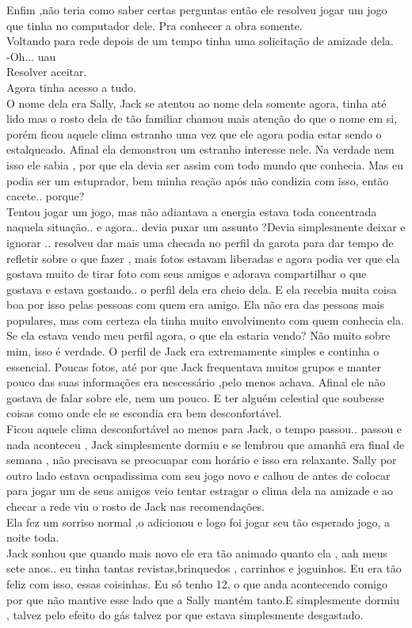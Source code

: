 \documentclass{book}
\begin{document}
 Enfim ,não teria como saber certas perguntas então ele resolveu jogar um jogo que tinha no computador dele. Pra conhecer a obra somente.\\
 Voltando para rede depois de um tempo tinha uma solicitação de amizade dela. \\
 -Oh... uau\\
 Resolver aceitar.\\
 Agora tinha acesso a tudo. \\
O nome dela era Sally, Jack se atentou ao nome dela somente agora, tinha até lido mas o rosto dela de tão familiar chamou mais atenção do que o nome em si, porém ficou aquele clima estranho uma vez que ele agora podia estar sendo o estalqueado. Afinal ela demonstrou um estranho interesse nele. Na verdade nem isso ele sabia , por que ela devia ser assim com todo mundo que conhecia. Mas eu podia ser um estuprador, bem minha reação após não condizia com isso, então cacete.. porque? \\ 
 Tentou jogar um jogo, mas não adiantava a energia estava toda concentrada naquela situação.. e agora.. devia puxar um assunto ?Devia simplesmente deixar e ignorar .. resolveu dar mais uma checada no perfil da garota para dar tempo de refletir sobre o que fazer , mais fotos estavam liberadas e agora podia ver que ela gostava muito de tirar foto com seus amigos e adorava compartilhar o que gostava e estava gostando.. o perfil dela era cheio dela. E ela recebia muita coisa boa por isso pelas pessoas com quem era amigo. Ela não era das pessoas mais populares, mas com certeza ela tinha muito envolvimento com quem conhecia ela. \\
 Se ela estava vendo meu perfil agora, o que ela estaria vendo? Não muito sobre mim, isso é verdade. O perfil de Jack era extremamente simples e continha o essencial. Poucas fotos, até por que Jack frequentava muitos grupos e manter pouco das suas informações era nescessário ,pelo menos achava. Afinal ele não gostava de falar sobre ele, nem um pouco. E ter alguém celestial que soubesse coisas como onde ele se escondia era bem desconfortável. \\
 Ficou aquele clima desconfortável ao menos para Jack, o tempo passou.. passou e nada aconteceu , Jack simplesmente dormiu e se lembrou que amanhã era final de semana , não precisava se preocuapar com horário e isso era relaxante. Sally por outro lado estava ocupadissima com seu jogo novo e calhou de antes de colocar para jogar um de seus amigos veio tentar estragar o clima dela na amizade e ao checar a rede viu o rosto de Jack nas recomendações. \\
 Ela fez um sorriso normal ,o adicionou e logo foi jogar seu tão esperado jogo, a noite toda.\\
Jack sonhou que quando mais novo ele era tão animado quanto ela , aah meus sete anos.. eu tinha tantas revistas,brinquedos , carrinhos e joguinhos. Eu era tão feliz com isso, essas coisinhas. Eu só tenho 12, o que anda acontecendo comigo por que não mantive esse lado que a Sally mantém tanto.E simplesmente dormiu , talvez pelo efeito do gás talvez por que estava simplesmente desgastado. \\
\end{document}
